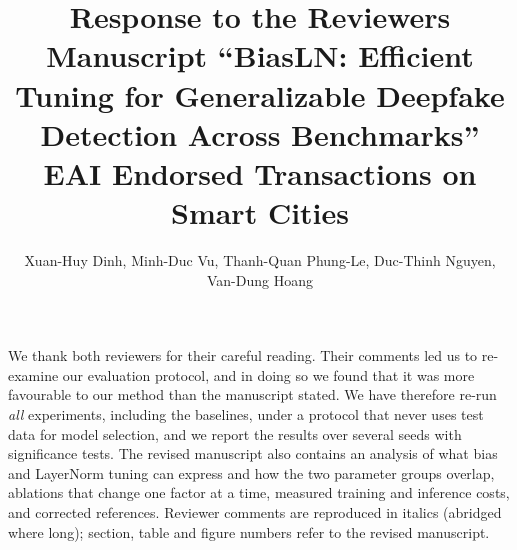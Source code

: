 \documentclass[11pt]{article}
\title{Response to the Reviewers\\[2pt]\normalsize Manuscript ``BiasLN: Efficient Tuning for Generalizable Deepfake Detection Across Benchmarks''\\EAI Endorsed Transactions on Smart Cities}
\author{Xuan-Huy Dinh, Minh-Duc Vu, Thanh-Quan Phung-Le, Duc-Thinh Nguyen, Van-Dung Hoang}
\date{}
\begin{document}
\maketitle

We thank both reviewers for their careful reading. Their comments led us to re-examine our evaluation protocol, and in doing so we found that it was more favourable to our method than the manuscript stated. We have therefore re-run \emph{all} experiments, including the baselines, under a protocol that never uses test data for model selection, and we report the results over several seeds with significance tests. The revised manuscript also contains an analysis of what bias and LayerNorm tuning can express and how the two parameter groups overlap, ablations that change one factor at a time, measured training and inference costs, and corrected references. Reviewer comments are reproduced in italics (abridged where long); section, table and figure numbers refer to the revised manuscript.
\end{document}
